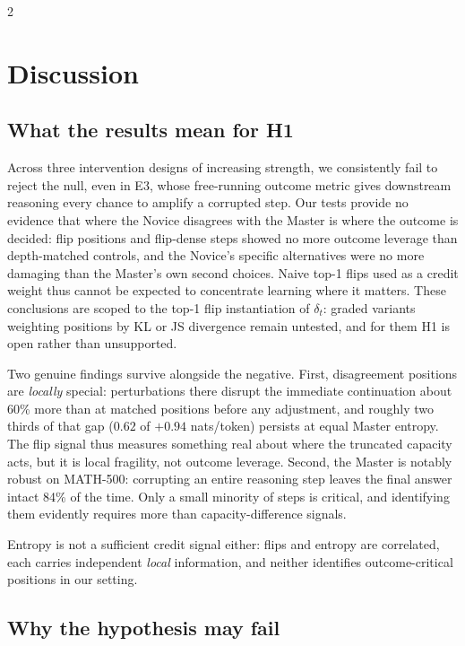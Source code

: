 \documentclass[9pt]{article}
\begin{document}
\begin{multicols}{2}
\section{Discussion}

\subsection{What the results mean for H1}

Across three intervention designs of increasing strength, we consistently
fail to reject the null, even in E3, whose free-running outcome metric gives
downstream reasoning every chance to amplify a corrupted step. Our tests
provide no evidence that where the Novice disagrees with the Master is where
the outcome is decided: flip positions and flip-dense steps showed no more
outcome leverage than depth-matched controls, and the Novice's specific
alternatives were no more damaging than the Master's own second choices. Naive
top-1 flips used as a credit weight thus cannot be expected to concentrate
learning where it matters. These conclusions are
scoped to the top-1 flip instantiation of $\delta_t$: graded variants
weighting positions by KL or JS divergence remain untested, and for them H1 is
open rather than unsupported.

Two genuine findings survive alongside the negative. First, disagreement
positions are \emph{locally} special: perturbations there disrupt the
immediate continuation about 60\% more than at matched positions before any
adjustment, and roughly two thirds of that gap ($0.62$ of $+0.94$ nats/token)
persists at equal Master entropy. The flip signal thus measures something
real about where the truncated capacity acts, but it is local fragility,
not outcome leverage. Second, the Master is notably robust on MATH-500:
corrupting an entire reasoning step leaves the final answer intact 84\% of the
time. Only a small minority of steps is critical, and identifying them
evidently requires more than capacity-difference signals.

Entropy is not a sufficient credit signal either: flips and entropy are
correlated, each carries independent \emph{local} information, and neither
identifies outcome-critical positions in our setting.

\subsection{Why the hypothesis may fail}


\end{multicols}
\end{document}
